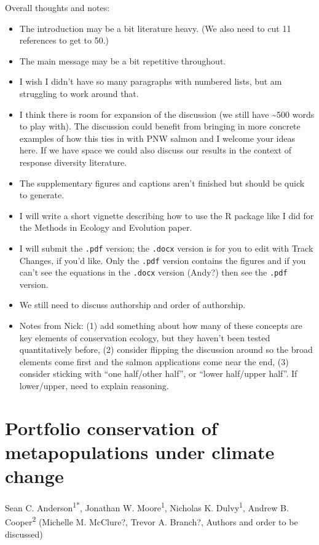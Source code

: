 Overall thoughts and notes:

\begin{itemize}
\item
  The introduction may be a bit literature heavy. (We also need to cut 11 references to get to 50.)
\item
  The main message may be a bit repetitive throughout.
\item
  I wish I didn't have so many paragraphs with numbered lists, but am struggling to work around that.
\item
  I think there is room for expansion of the discussion (we still have \textasciitilde{}500 words to play with). The discussion could benefit from bringing in more concrete examples of how this ties in with PNW salmon and I welcome your ideas here. If we have space we could also discuss our results in the context of response diversity literature.
\item
  The supplementary figures and captions aren't finished but should be quick to generate.
\item
  I will write a short vignette describing how to use the R package like I did for the Methods in Ecology and Evolution paper.
\item
  I will submit the \texttt{.pdf} version; the \texttt{.docx} version is for you to edit with Track Changes, if you'd like. Only the \texttt{.pdf} version contains the figures and if you can't see the equations in the \texttt{.docx} version (Andy?) then see the \texttt{.pdf} version.
\item
  We still need to discuss authorship and order of authorship.
\item
  Notes from Nick: (1) add something about how many of these concepts are key elements of conservation ecology, but they haven't been tested quantitatively before, (2) consider flipping the discussion around so the broad elements come first and the salmon applications come near the end, (3) consider sticking with ``one half/other half'', or ``lower half/upper half''. If lower/upper, need to explain reasoning.
\end{itemize}

\newpage

\section{Portfolio conservation of metapopulations under climate change}

\bigskip

Sean C. Anderson\textsuperscript{1*}, Jonathan W. Moore\textsuperscript{1}, Nicholas K. Dulvy\textsuperscript{1}, Andrew B. Cooper\textsuperscript{2} (Michelle M. McClure?, Trevor A. Branch?, Authors and order to be discussed)

